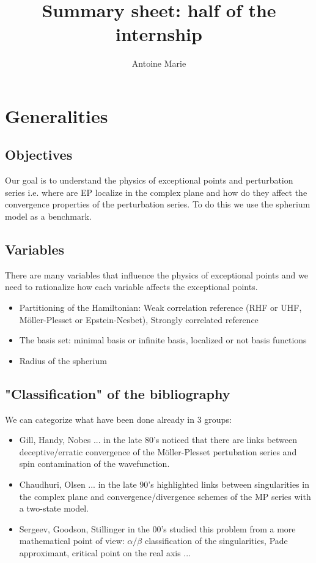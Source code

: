 \documentclass{article}
\title{Summary sheet: half of the internship}
\author{Antoine Marie}
\begin{document}
\maketitle

\section{Generalities}

\subsection{Objectives}
Our goal is to understand the physics of exceptional points and perturbation series i.e. where are EP localize in the complex plane and how do they affect the convergence properties of the perturbation series. To do this we use the spherium model as a benchmark.

\subsection{Variables}

There are many variables that influence the physics of exceptional points and we need to rationalize how each variable affects the exceptional points.

\begin{itemize}
\item Partitioning of the Hamiltonian: Weak correlation reference (RHF or UHF, Möller-Plesset or Epstein-Nesbet), Strongly correlated reference
\item The basis set: minimal basis or infinite basis, localized or not basis functions
\item Radius of the spherium
\end{itemize}

\subsection{"Classification" of the bibliography}

We can categorize what have been done already in 3 groups:

\begin{itemize}
\item Gill, Handy, Nobes ... in the late 80's noticed that there are links between deceptive/erratic convergence of the Möller-Plesset pertubation series and spin contamination of the wavefunction.

\item Chaudhuri, Olsen ... in the late 90's highlighted links between singularities in the complex plane and convergence/divergence schemes of the MP series with a two-state model.

\item Sergeev, Goodson, Stillinger in the 00's studied this problem from a more mathematical point of view: $\alpha / \beta$ classification of the singularities, Pade approximant, critical point on the real axis ...
\end{itemize}
\end{document}
